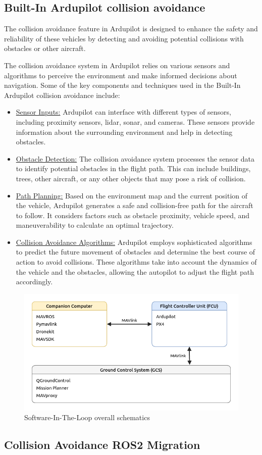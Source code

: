 \subsection{Built-In Ardupilot collision avoidance}
The collision avoidance feature in Ardupilot is designed to enhance the safety and reliability of these vehicles by detecting and avoiding potential collisions with obstacles or other aircraft.

The collision avoidance system in Ardupilot relies on various sensors and algorithms to perceive the environment and make informed decisions about navigation. Some of the key components and techniques used in the Built-In Ardupilot collision avoidance include:

\begin{itemize}
    \item \underline{Sensor Inputs:} Ardupilot can interface with different types of sensors, including proximity sensors, lidar, sonar, and cameras. These sensors provide information about the surrounding environment and help in detecting obstacles.
    \item \underline{Obstacle Detection:} The collision avoidance system processes the sensor data to identify potential obstacles in the flight path. This can include buildings, trees, other aircraft, or any other objects that may pose a risk of collision.
    \item \underline{Path Planning:} Based on the environment map and the current position of the vehicle, Ardupilot generates a safe and collision-free path for the aircraft to follow. It considers factors such as obstacle proximity, vehicle speed, and maneuverability to calculate an optimal trajectory.
    \item \underline{Collision Avoidance Algorithms:} Ardupilot employs sophisticated algorithms to predict the future movement of obstacles and determine the best course of action to avoid collisions. These algorithms take into account the dynamics of the vehicle and the obstacles, allowing the autopilot to adjust the flight path accordingly.
\end{itemize}


\begin{figure}[H]
    \centering
    \includegraphics[width=0.65\linewidth]{./projects/ardupilot/sitl_overall.png}
    \caption{Software-In-The-Loop overall schematics}
\end{figure}

\subsection{Collision Avoidance ROS2 Migration}
